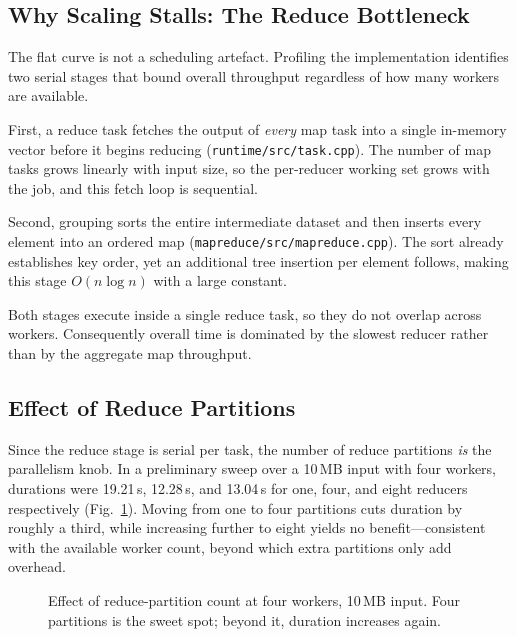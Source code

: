 \documentclass[conference]{IEEEtran}
\begin{document}
\subsection{Why Scaling Stalls: The Reduce Bottleneck}

The flat curve is not a scheduling artefact. Profiling the implementation
identifies two serial stages that bound overall throughput regardless of how
many workers are available.

First, a reduce task fetches the output of \emph{every} map task into a
single in-memory vector before it begins reducing
(\texttt{runtime/src/task.cpp}). The number of map tasks grows linearly with
input size, so the per-reducer working set grows with the job, and this
fetch loop is sequential.

Second, grouping sorts the entire intermediate dataset and then inserts
every element into an ordered map
(\texttt{mapreduce/src/mapreduce.cpp}). The sort already establishes key
order, yet an additional tree insertion per element follows, making this
stage $O(n \log n)$ with a large constant.

Both stages execute inside a single reduce task, so they do not overlap
across workers. Consequently overall time is dominated by the slowest
reducer rather than by the aggregate map throughput.

\subsection{Effect of Reduce Partitions}


Since the reduce stage is serial per task, the number of reduce partitions
\emph{is} the parallelism knob. In a preliminary sweep over a 10\,MB input
with four workers, durations were 19.21\,s, 12.28\,s, and 13.04\,s for one,
four, and eight reducers respectively (Fig.~\ref{fig:reducers}). Moving from
one to four partitions cuts duration by roughly a third, while increasing
further to eight yields no benefit---consistent with the available worker
count, beyond which extra partitions only add overhead.

\begin{figure}[t]
\centering
{}
\caption{Effect of reduce-partition count at four workers, 10\,MB input.
Four partitions is the sweet spot; beyond it, duration increases again.}
\label{fig:reducers}
\end{figure}
\end{document}
